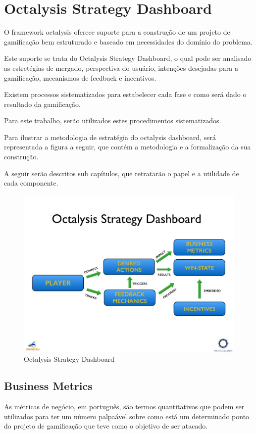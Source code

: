 \section{Octalysis Strategy Dashboard}
\label{sec:octalysisdashborad}
O framework octalysis oferece suporte para a construção de um projeto de gamificação
bem estruturado e baseado em necessidades do domínio do problema.

Este suporte se trata do Octalysis Strategy Dashboard, o qual pode ser analisado as
estretégias de mergado, perspectiva do usuário, intenções desejadas para a gamificação,
mecanismos de feedback e incentivos.

Existem processos sistematizados para estabelecer cada fase e como será dado o 
resultado da gamificação. 

Para este trabalho, serão utilizados estes procedimentos sistematizados. 

Para ilustrar a metodologia de estratégia do octalysis dashboard, será representada
a figura a seguir, que contém a metodologia e a formalização da sua construção.

A seguir serão descritos sub capítulos, que retratarão o papel e a utilidade de cada
componente.


 \begin{figure}[h]
     \centering

     \includegraphics[width=450px, scale=1]{figuras/dashboard}
     \caption{Octalysis Strategy Dashboard}

     \label{fig:dashboard}
 \end{figure}

\subsection{Business Metrics}
\label{sub:business_metrics}
As métricas de negócio, em português, são termos quantitativos que podem ser utilizados
para ter um número palpaável sobre como está um determinado ponto do projeto de gamificação
que teve como o objetivo de ser atacado.


